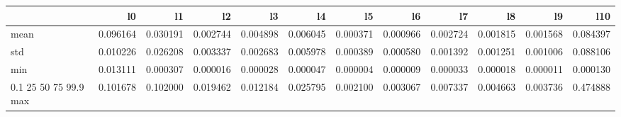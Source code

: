 \begin{tabular}{lrrrrrrrrrrr}
\toprule
 & l0 & l1 & l2 & l3 & l4 & l5 & l6 & l7 & l8 & l9 & l10 \\
\midrule
mean & 0.096164 & 0.030191 & 0.002744 & 0.004898 & 0.006045 & 0.000371 & 0.000966 & 0.002724 & 0.001815 & 0.001568 & 0.084397 \\
std & 0.010226 & 0.026208 & 0.003337 & 0.002683 & 0.005978 & 0.000389 & 0.000580 & 0.001392 & 0.001251 & 0.001006 & 0.088106 \\
min & 0.013111 & 0.000307 & 0.000016 & 0.000028 & 0.000047 & 0.000004 & 0.000009 & 0.000033 & 0.000018 & 0.000011 & 0.000130 \\
0.1%
25%
50%
75%
99.9%
max & 0.101678 & 0.102000 & 0.019462 & 0.012184 & 0.025795 & 0.002100 & 0.003067 & 0.007337 & 0.004663 & 0.003736 & 0.474888 \\
\bottomrule
\end{tabular}
